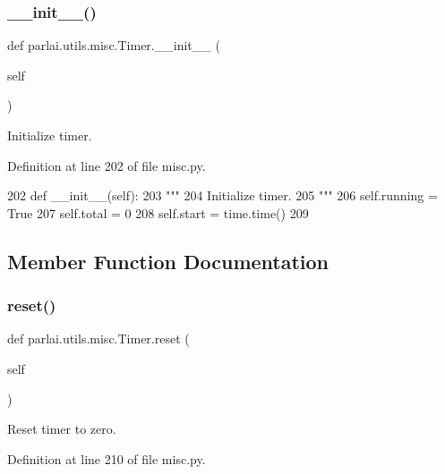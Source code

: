 \subsubsection{\texorpdfstring{\+\_\+\+\_\+init\+\_\+\+\_\+()}{\_\_init\_\_()}}
{\footnotesize\ttfamily def parlai.\+utils.\+misc.\+Timer.\+\_\+\+\_\+init\+\_\+\+\_\+ (\begin{DoxyParamCaption}\item[{}]{self }\end{DoxyParamCaption})}

\begin{DoxyVerb}Initialize timer.
\end{DoxyVerb}
 

Definition at line 202 of file misc.\+py.


\begin{DoxyCode}
202     \textcolor{keyword}{def }\_\_init\_\_(self):
203         \textcolor{stringliteral}{"""}
204 \textcolor{stringliteral}{        Initialize timer.}
205 \textcolor{stringliteral}{        """}
206         self.running = \textcolor{keyword}{True}
207         self.total = 0
208         self.start = time.time()
209 
\end{DoxyCode}


\subsection{Member Function Documentation}
\mbox{\label{classparlai_1_1utils_1_1misc_1_1Timer_a68bdf8abb3fe00edc639b21944d03371}} 
\subsubsection{\texorpdfstring{reset()}{reset()}}
{\footnotesize\ttfamily def parlai.\+utils.\+misc.\+Timer.\+reset (\begin{DoxyParamCaption}\item[{}]{self }\end{DoxyParamCaption})}

\begin{DoxyVerb}Reset timer to zero.
\end{DoxyVerb}
 

Definition at line 210 of file misc.\+py.


